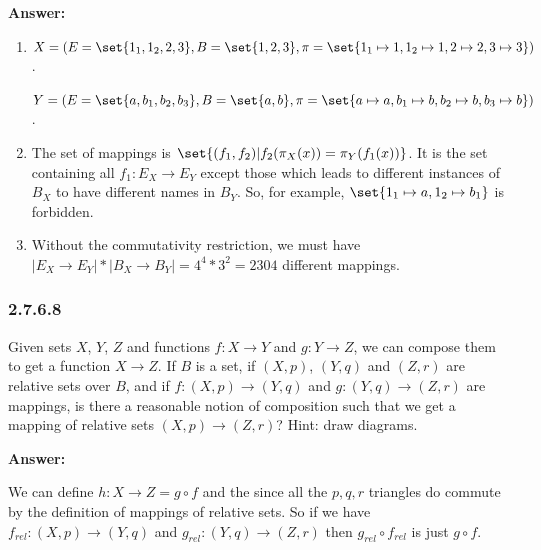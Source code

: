 \documentclass{article}
\newcommand{\vsp}[0]{\vspace*{10pt}\par}
\newcommand{\exercise}[1]{\subsubsection*{#1}}
\newcommand{\ans}[0]{\vsp\textbf{Answer: }\vsp}
\newcommand{\ei}{\item}
\newcommand{\eb}{\begin{enumerate}[label=(\alph*)]\ei}
\newcommand{\ee}{\end{enumerate}}
\begin{document}
\ans

\eb $X = (E =
    \set{1_1,1_2,2,3}, B = \set{1, 2, 3}, \pi = \set{1_1 \mapsto 1, 1_2
    \mapsto 1, 2 \mapsto 2, 3 \mapsto 3})$.

    $Y = (E = \set{a, b_1, b_2, b_3}, B = \set{a,b}, \pi = \set{a \mapsto a, b_1
    \mapsto b, b_2 \mapsto b, b_3 \mapsto b})$.
\ei The set of mappings is $\set{(f_1, f_2) | f_2(\pi_X(x)) =
    \pi_Y(f_1(x))}$. It is the set containing all $f_1: E_X \to E_Y$ except
    those which leads to different instances of $B_X$ to have different names in
    $B_Y$. So, for example, $\set{1_1 \mapsto a, 1_2 \mapsto b_1}$ is forbidden.
\ei Without the commutativity restriction, we must have $|E_X \to E_Y| * |B_X
    \to B_Y| = 4^4 * 3^2 = 2304$ different mappings.
\ee

\exercise{2.7.6.8}

Given sets $X$, $Y$, $Z$ and functions $f : X \to Y$ and $g: Y \to Z$, we can
compose them to get a function $X \to Z$. If $B$ is a set, if $(X, p)$, $(Y,
q)$ and $(Z, r)$ are relative sets over $B$, and if $f : (X, p) \to (Y, q)$ and
$g: (Y, q) \to (Z, r)$ are mappings, is there a reasonable notion of composition
such that we get a mapping of relative sets $(X, p) \to (Z, r)$? Hint: draw
diagrams.

\ans

\begin{center}
\end{center}

We can define $h : X \to Z = g \circ f$ and the since all the $p,q,r$ triangles do commute by the
definition of mappings of relative sets. So if we have $f_{rel} : (X,p) \to (Y,q)$ and $g_{rel} :
(Y,q) \to (Z,r)$ then $g_{rel} \circ f_{rel}$ is just $g \circ f$.
\end{document}
